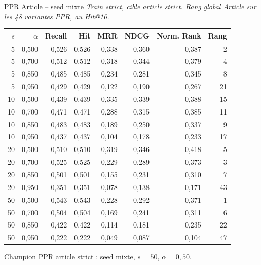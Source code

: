 \documentclass[aspectratio=169,10pt]{beamer}
\newcommand{\keybox}[1]{%
  \begin{center}
  \colorbox{accentsoft}{\parbox{0.92\linewidth}{\centering #1}}
  \end{center}}
\begin{document}
\begin{frame}{PPR Article -- seed mixte}
  \tiny
  \textit{Train strict, cible article strict. Rang global Article sur les 48 variantes PPR, au Hit@10.}

  \vspace{0.15em}
  \begin{center}
  \renewcommand{\arraystretch}{0.95}
  \setlength{\tabcolsep}{3pt}
  \begin{tabular}{@{}r r r r r r r r@{}}
    \toprule
    $s$ & $\alpha$ & Recall & Hit & MRR & NDCG & Norm. Rank & Rang \\
    \midrule
    5 & 0,500 & 0,526 & 0,526 & 0,338 & 0,360 & 0,387 & 2 \\
    5 & 0,700 & 0,512 & 0,512 & 0,318 & 0,344 & 0,379 & 4 \\
    5 & 0,850 & 0,485 & 0,485 & 0,234 & 0,281 & 0,345 & 8 \\
    5 & 0,950 & 0,429 & 0,429 & 0,122 & 0,190 & 0,267 & 21 \\
    10 & 0,500 & 0,439 & 0,439 & 0,335 & 0,339 & 0,388 & 15 \\
    10 & 0,700 & 0,471 & 0,471 & 0,288 & 0,315 & 0,385 & 11 \\
    10 & 0,850 & 0,483 & 0,483 & 0,189 & 0,250 & 0,337 & 9 \\
    10 & 0,950 & 0,437 & 0,437 & 0,104 & 0,178 & 0,233 & 17 \\
    20 & 0,500 & 0,510 & 0,510 & 0,319 & 0,346 & 0,418 & 5 \\
    20 & 0,700 & 0,525 & 0,525 & 0,229 & 0,289 & 0,373 & 3 \\
    20 & 0,850 & 0,501 & 0,501 & 0,155 & 0,231 & 0,310 & 7 \\
    20 & 0,950 & 0,351 & 0,351 & 0,078 & 0,138 & 0,171 & 43 \\
    \rowcolor{green!10}
    50 & 0,500 & 0,543 & 0,543 & 0,228 & 0,292 & 0,371 & 1 \\
    50 & 0,700 & 0,504 & 0,504 & 0,169 & 0,241 & 0,311 & 6 \\
    50 & 0,850 & 0,422 & 0,422 & 0,114 & 0,181 & 0,235 & 22 \\
    50 & 0,950 & 0,222 & 0,222 & 0,049 & 0,087 & 0,104 & 47 \\
    \bottomrule
  \end{tabular}
  \end{center}

  \vspace{0.2em}
  \keybox{\scriptsize Champion PPR article strict : seed mixte, $s=50$, $\alpha=0{,}50$.}
\end{frame}
\end{document}
